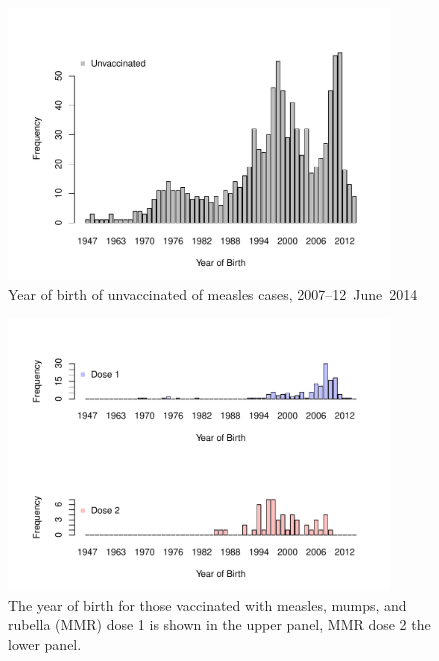 \documentclass{article}
\begin{document}
\begin{figure}
\begin{center}
     \includegraphics[width=0.9\textwidth]{dob_vacc_unvac.pdf}
\end{center}
\caption{Year of birth of unvaccinated of measles cases, 2007--12~June~2014}
\label{fig:yearandvac}
\end{figure}

\begin{figure}
\begin{center}
     \includegraphics[width=0.9\textwidth]{dob_vacc_dose.pdf}
\end{center}
\caption{The year of birth for those vaccinated with measles, mumps, and rubella (MMR) dose 1 is shown in the upper panel, MMR dose 2 the lower panel.}
\label{fig:yearandvacf}
\end{figure}
\end{document}
